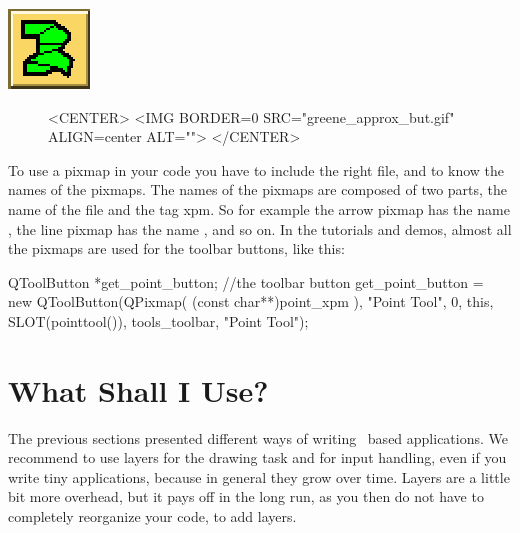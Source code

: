 \begin{ccTexOnly}
\mbox{\includegraphics{greene_approx_but.eps}}
\end{ccTexOnly}
\begin{figure}
\begin{ccHtmlOnly}
<CENTER>
<IMG BORDER=0 SRC="greene_approx_but.gif"  ALIGN=center  ALT="">
</CENTER>
\end{ccHtmlOnly}
\end{figure}

To use a pixmap in your code you have to include the right file, and
to know the names of the pixmaps. The names of the pixmaps are
composed of two parts, the name of the file and the tag xpm. So for
example the arrow pixmap has the name , the line
pixmap has the name , and so on. In the
tutorials and demos, almost all the pixmaps are used for the toolbar
buttons, like this:

\ccExample
\begin{ccExampleCode}
    QToolButton *get_point_button; //the toolbar button
    get_point_button =  new QToolButton(QPixmap( (const char**)point_xpm ),
                                     "Point Tool", 
                                     0, 
                                     this, 
                                     SLOT(pointtool()), 
                                     tools_toolbar, 
                                     "Point Tool");
\end{ccExampleCode}



\section{What Shall I Use?}

The previous sections presented different ways of writing \qt\ based 
applications. We recommend to use layers for the drawing task and for
input handling, even if you write tiny applications, because in general
they grow over time. Layers are a little bit more overhead, but 
it pays off in the long run, as you then do not have to completely
reorganize your code, to add layers. 








